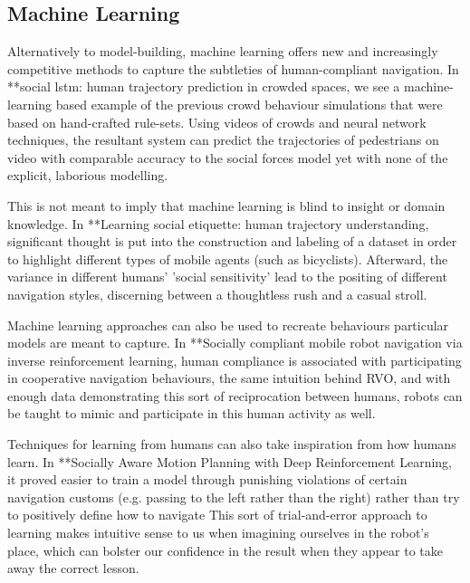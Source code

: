 \documentclass{sfuthesis}
\begin{document}







\subsection{Machine Learning}

Alternatively to model-building, machine learning offers new and increasingly competitive methods to capture the subtleties of human-compliant navigation. In **social lstm: human trajectory prediction in crowded spaces, we see a machine-learning based example of the previous crowd behaviour simulations that were based on hand-crafted rule-sets. Using videos of crowds and neural network techniques, the resultant system can predict the trajectories of pedestrians on video with comparable accuracy to the social forces model yet with none of the explicit, laborious modelling. 

This is not meant to imply that machine learning is blind to insight or domain knowledge. In **Learning social etiquette: human trajectory understanding, significant thought is put into the construction and labeling of a dataset in order to highlight different types of mobile agents (such as bicyclists). Afterward, the variance in different humans' 'social sensitivity' lead to the positing of different navigation styles, discerning between a thoughtless rush and a casual stroll.

Machine learning approaches can also be used to recreate behaviours particular models are meant to capture. In **Socially compliant mobile robot navigation via inverse reinforcement learning, human compliance is associated with participating in cooperative navigation behaviours, the same intuition behind RVO, and with enough data demonstrating this sort of reciprocation between humans, robots can be taught to mimic and participate in this human activity as well.

Techniques for learning from humans can also take inspiration from how humans learn. In **Socially Aware Motion Planning with Deep Reinforcement Learning, it proved easier to train a model through punishing violations of certain navigation customs (e.g. passing to the left rather than the right) rather than try to positively define how to navigate This sort of trial-and-error approach to learning makes intuitive sense to us when imagining ourselves in the robot's place, which can bolster our confidence in the result when they appear to take away the correct lesson.
\end{document}
